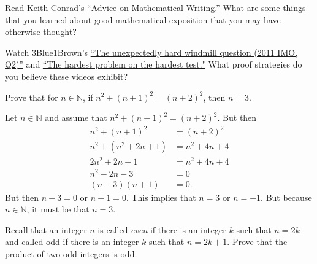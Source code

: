 \documentclass[11pt,letterpaper]{article}
\begin{document}

 Read Keith Conrad's \href{https://kconrad.math.uconn.edu/blurbs/proofs/writingtips.pdf}{``Advice on Mathematical Writing.''} What are some things that you learned about good mathematical exposition that you may have otherwise thought? \pspace






\newpage





 Watch 3Blue1Brown's \href{https://www.youtube.com/watch?v=M64HUIJFTZM}{``The unexpectedly hard windmill question (2011 IMO, Q2)''} and \href{https://www.youtube.com/watch?v=OkmNXy7er84}{``The hardest problem on the hardest test."} What proof strategies do you believe these videos exhibit? \pspace






\newpage





 Prove that for $n \in \mathbb{N}$, if $n^2 + (n + 1)^2= (n + 2)^2$, then $n= 3$. \pspace

\sol Let $n \in \mathbb{N}$ and assume that $n^2 + (n + 1)^2= (n + 2)^2$. But then
	\[
	\begin{aligned}
	n^2 + (n + 1)^2&= (n + 2)^2 \\
	n^2 + (n^2 + 2n + 1)&= n^2 + 4n + 4 \\
	2n^2 + 2n + 1&= n^2 + 4n + 4 \\
	n^2 - 2n - 3&= 0 \\
	(n - 3)(n + 1)&= 0.
	\end{aligned}
	\]
But then $n - 3= 0$ or $n + 1= 0$. This implies that $n= 3$ or $n= -1$. But because $n \in \mathbb{N}$, it must be that $n= 3$. 





\newpage





 Recall that an integer $n$ is called \textit{even} if there is an integer $k$ such that $n= 2k$ and called odd if there is an integer $k$ such that $n= 2k + 1$. Prove that the product of two odd integers is odd. \pspace
\end{document}
